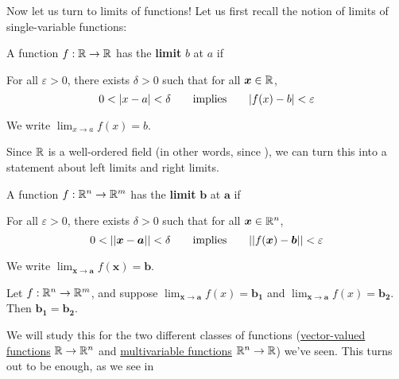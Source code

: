 Now let us turn to limits of functions!  Let us first recall the notion of limits of single-variable functions:


\begin{definition}
    A function $f :\mathbb{R} \to \mathbb{R}$ has the \textbf{limit} $b$ at $a$ if
    
    \vspace{1em}
    For all $\varepsilon>0$, there exists $\delta > 0$ such that for all $\bm{x} \in \mathbb{R}$, $$0 < |x-a| < \delta \qquad \textnormal{implies} \qquad |f(x) - b | < \varepsilon$$
    
    We write $\lim_{x \to a}f(x) = b$.
    
    \end{definition}


Since $\mathbb{R}$ is a well-ordered field (in other words, since ), we can turn this into a statement about left limits and right limits.










\begin{definition}
    A function $f : \mathbb{R}^n \to \mathbb{R}^m$ has the \textbf{limit} $\bm{b}$ at $\bm{a}$ if
    
    \vspace{1em}
    For all $\varepsilon>0$, there exists $\delta > 0$ such that for all $\bm{x} \in \mathbb{R}^n$, $$0 < ||\bm{x} - \bm{a} || < \delta \qquad \textnormal{implies} \qquad ||f(\bm{x}) - \bm{b} || < \varepsilon$$
    
    We write $\lim_{\bm{x} \to \bm{a}}f(\bm{x}) = \bm{b}$.
    
    \end{definition}


    \begin{proposition}
    Let $f: \mathbb{R}^n \to \mathbb{R}^m$, and suppose $\lim_{\bm{x} \to \bm{a}}f(x) = \bm{b_1}$ and $\lim_{\bm{x} \to \bm{a}}f(x) = \bm{b_2}$.  Then $\bm{b_1} = \bm{b_2}$.
    \end{proposition}

We will study this for the two different classes of functions (\hyperref[limvectorval]{vector-valued functions} $\mathbb{R} \to \mathbb{R}^n$ and \hyperref[limmulti]{multivariable functions} $\mathbb{R}^n \to \mathbb{R}$)  we've seen.  This turns out to be enough, as we see in 















